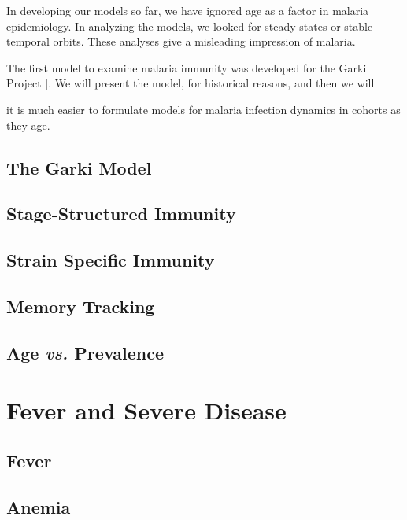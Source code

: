 \documentclass[
]{book}
\begin{document}
In developing our models so far, we have ignored age as a factor in malaria epidemiology. In analyzing the models, we looked for steady states or stable temporal orbits. These analyses give a misleading impression of malaria.

The first model to examine malaria immunity was developed for the Garki Project {[}\citeproc{ref-DietzK1974GarkiModel}{65}{]}. We will present the model, for historical reasons, and then we will

it is much easier to formulate models for malaria infection dynamics in cohorts as they age.

\section{The Garki Model}\label{the-garki-model}

\section{Stage-Structured Immunity}\label{stage-structured-immunity}

\section{Strain Specific Immunity}\label{strain-specific-immunity}

\section{Memory Tracking}\label{memory-tracking}

\section{\texorpdfstring{Age \emph{vs.} Prevalence}{Age vs. Prevalence}}\label{age-vs.-prevalence}

\chapter{Fever and Severe Disease}\label{fever-and-severe-disease}

\section{Fever}\label{fever}

\section{Anemia}\label{anemia}
\end{document}
